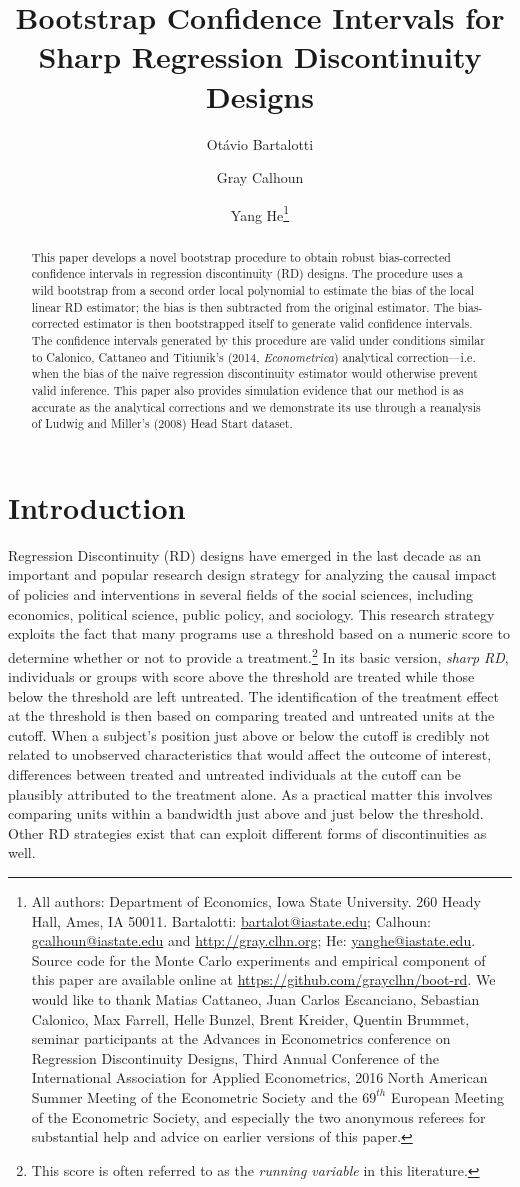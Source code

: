 \documentclass[12pt,fleqn]{article}
\title{Bootstrap Confidence Intervals for Sharp Regression Discontinuity Designs}
\author{Ot\'avio Bartalotti \and Gray Calhoun \and Yang He\thanks{%
  All authors: Department of Economics, Iowa State University.
  260 Heady Hall, Ames, IA 50011.
  Bartalotti: \protect\url{bartalot@iastate.edu};
  Calhoun: \protect\url{gcalhoun@iastate.edu} and
  \protect\url{http://gray.clhn.org};
  He: \protect\url{yanghe@iastate.edu}. Source code for the Monte Carlo
  experiments and empirical component of this paper are available online
  at \protect\url{https://github.com/grayclhn/boot-rd}. We would like to
  thank Matias Cattaneo, Juan Carlos Escanciano, Sebastian Calonico, Max Farrell, Helle Bunzel, Brent Kreider, Quentin Brummet, seminar participants at
  the Advances in Econometrics conference on Regression Discontinuity
  Designs, Third Annual Conference of the International Association for Applied Econometrics,
 2016 North American Summer Meeting of the Econometric Society and the $69^{th}$ European Meeting of the Econometric Society, and especially the two anonymous referees for
  substantial help and advice on earlier versions of this paper.}}
\begin{document}
\maketitle

\begin{abstract}\noindent
  This paper develops a novel bootstrap procedure to obtain robust
  bias-corrected confidence intervals in regression discontinuity (RD) designs. The procedure uses a wild bootstrap from a
  second order local polynomial to estimate the bias of the local linear RD
  estimator; the bias is then subtracted from the original estimator. The
  bias-corrected estimator is then bootstrapped itself to generate valid
  confidence intervals. The confidence intervals generated by this procedure
  are valid under conditions similar to Calonico, Cattaneo and Titiunik's
  (2014, \textit{Econometrica}) analytical correction---i.e.  when the bias of
  the naive regression discontinuity estimator would otherwise prevent valid
  inference. This paper also provides simulation evidence that our method is
  as accurate as the analytical corrections and we demonstrate its use through
  a reanalysis of Ludwig and Miller's (2008) Head Start dataset.
\end{abstract}

\section{Introduction}
Regression Discontinuity (RD) designs have emerged in the last decade as an
important and popular research design strategy for analyzing the causal impact
of policies and interventions in several fields of the social sciences,
including economics, political science, public policy, and sociology.  This
research strategy exploits the fact that many programs use a threshold based
on a numeric score to determine whether or not to provide a
treatment.\footnote{This score is often referred to as the \textit{running variable} in this
  literature.}
In its basic version, \textit{sharp RD}, individuals or groups with score
above the threshold are treated while those below the threshold are left
untreated. The identification of the treatment effect at the threshold is then
based on comparing treated and untreated units at the cutoff. When a subject's
position just above or below the cutoff is credibly not related to unobserved
characteristics that would affect the outcome of interest, differences between
treated and untreated individuals at the cutoff can be plausibly attributed to
the treatment alone. As a practical matter this involves comparing units
within a bandwidth just above and just below the threshold. Other RD
strategies exist that can exploit different forms of discontinuities as well.
\end{document}
